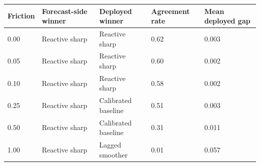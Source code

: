\begin{tabular}{lllll}
\toprule
Friction & Forecast-side winner & Deployed winner & Agreement rate & Mean deployed gap \\
\midrule
0.00 & Reactive sharp & Reactive sharp & 0.62 & 0.003 \\
0.05 & Reactive sharp & Reactive sharp & 0.60 & 0.002 \\
0.10 & Reactive sharp & Reactive sharp & 0.58 & 0.002 \\
0.25 & Reactive sharp & Calibrated baseline & 0.51 & 0.003 \\
0.50 & Reactive sharp & Calibrated baseline & 0.31 & 0.011 \\
1.00 & Reactive sharp & Lagged smoother & 0.01 & 0.057 \\
\bottomrule
\end{tabular}
